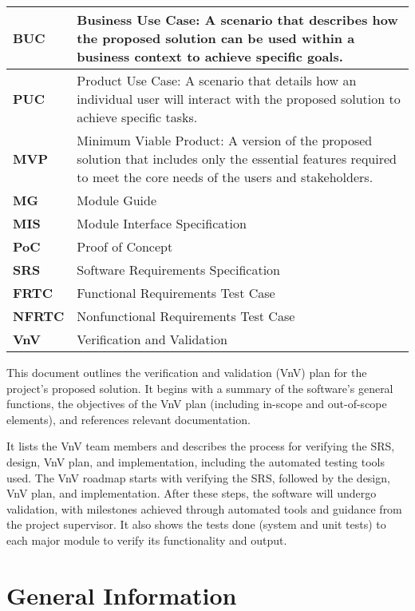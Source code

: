 \documentclass[12pt, titlepage]{article}
\begin{document}
\begin{longtable}[c]{|p{}|p{}|}
  \textbf{BUC} & Business Use Case: A scenario that describes how the proposed solution can be used within a business context to achieve specific goals. \\ \hline
  \textbf{PUC} & Product Use Case: A scenario that details how an individual user will interact with the proposed solution to achieve specific tasks. \\ \hline
  \textbf{MVP} & Minimum Viable Product: A version of the proposed solution that includes only the essential features required to meet the core needs of the users and stakeholders. \\ \hline
  \textbf{MG} & Module Guide \\ \hline
  \textbf{MIS} & Module Interface Specification \\ \hline
  \textbf{PoC} & Proof of Concept \\ \hline
  \textbf{SRS} & Software Requirements Specification \\ \hline
  \textbf{FRTC} & Functional Requirements Test Case \\ \hline
  \textbf{NFRTC} & Nonfunctional Requirements Test Case \\ \hline
  \textbf{VnV} & Verification and Validation \\ \hline
\end{longtable}

\pagebreak
\newpage


This document outlines the verification and validation (VnV) plan for the project's proposed solution. It begins with a summary of the software's general functions, the objectives of the VnV plan (including in-scope and out-of-scope elements), and references relevant documentation.

It lists the VnV team members and describes the process for verifying the SRS, design, VnV plan, and implementation, including the automated testing tools used. The VnV roadmap starts with verifying the SRS, followed by the design, VnV plan, and implementation. After these steps, the software will undergo validation, with milestones achieved through automated tools and guidance from the project supervisor. It also shows the tests done (system and unit tests) to each major module to verify its functionality and output.

\section{General Information}
\end{document}
